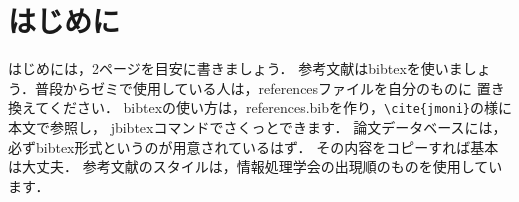 ﻿\section{はじめに}\label{sec:intro}
はじめには，2ページを目安に書きましょう．
参考文献はbibtexを使いましょう．普段からゼミで使用している人は，referencesファイルを自分のものに
置き換えてください．
bibtexの使い方は，references.bibを作り，\verb|\cite{jmoni}|の様に本文で参照\cite{jmoni}し，
jbibtexコマンドでさくっとできます．
論文データベースには，必ずbibtex形式というのが用意されているはず．
その内容をコピーすれば基本は大丈夫．
参考文献のスタイルは，情報処理学会の出現順のものを使用しています．
